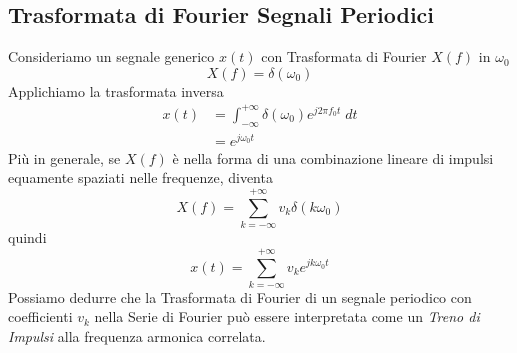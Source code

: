 \documentclass{article}
\begin{document}
		\subsection{Trasformata di Fourier Segnali Periodici}
		    Consideriamo un segnale generico $ x(t) $ con Trasformata di Fourier $ X(f) $ in $ \omega_0 $
		    \[
		        X(f) = \delta(\omega_0)
		    \]
		    Applichiamo la trasformata inversa
		    \[
		        \begin{aligned}
		            x(t) &= \int_{-\infty}^{+\infty} {\delta(\omega_0) e^{j2\pi f_0 t}\; dt} \\
		            &= e^{j\omega_0 t}
		        \end{aligned}
		    \]
		    Più in generale, se $ X(f) $ è nella forma di una combinazione lineare di impulsi equamente spaziati nelle frequenze, diventa
		    \[
		        X(f) = \sum_{k=-\infty}^{+\infty} {v_k \delta(k\omega_0)}
		    \]
		    quindi
		    \[
		        x(t) = \sum_{k=-\infty}^{+\infty} {v_k e^{jk\omega_0 t}}
		    \]
		    Possiamo dedurre che la Trasformata di Fourier di un segnale periodico con coefficienti $ v_k $ nella Serie di Fourier può essere interpretata come un \textit{Treno di Impulsi} alla frequenza armonica correlata.
\end{document}

